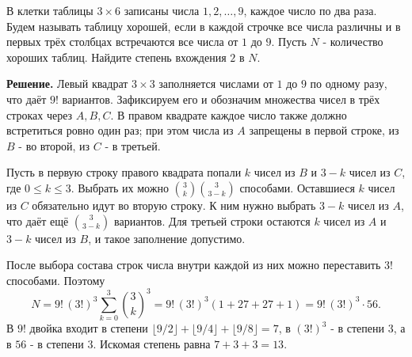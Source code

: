 \begin{problems}
\item В клетки таблицы $3\times6$ записаны числа $1,2,\ldots,9$, каждое число по два раза. Будем называть таблицу хорошей, если в каждой строчке все числа различны и в первых трёх столбцах встречаются все числа от $1$ до $9$. Пусть $N$ - количество хороших таблиц. Найдите степень вхождения $2$ в $N$.
\par\smallskip\noindent\textbf{Решение.} Левый квадрат $3\times3$ заполняется числами от $1$ до $9$ по одному разу, что даёт $9!$ вариантов. Зафиксируем его и обозначим множества чисел в трёх строках через $A,B,C$. В правом квадрате каждое число также должно встретиться ровно один раз; при этом числа из $A$ запрещены в первой строке, из $B$ - во второй, из $C$ - в третьей.
\par Пусть в первую строку правого квадрата попали $k$ чисел из $B$ и $3-k$ чисел из $C$, где $0\le k\le3$. Выбрать их можно $\binom{3}{k}\binom{3}{3-k}$ способами. Оставшиеся $k$ чисел из $C$ обязательно идут во вторую строку. К ним нужно выбрать $3-k$ чисел из $A$, что даёт ещё $\binom{3}{3-k}$ вариантов. Для третьей строки остаются $k$ чисел из $A$ и $3-k$ чисел из $B$, и такое заполнение допустимо.
\par После выбора состава строк числа внутри каждой из них можно переставить $3!$ способами. Поэтому
\[
N=9!\,(3!)^3\sum_{k=0}^{3}\binom{3}{k}^3
=9!\,(3!)^3(1+27+27+1)
=9!\,(3!)^3\cdot56.
\]
В $9!$ двойка входит в степени $\lfloor9/2\rfloor+\lfloor9/4\rfloor+\lfloor9/8\rfloor=7$, в $(3!)^3$ - в степени $3$, а в $56$ - в степени $3$. Искомая степень равна $7+3+3=\boxed{13}$.\par


\end{problems}

